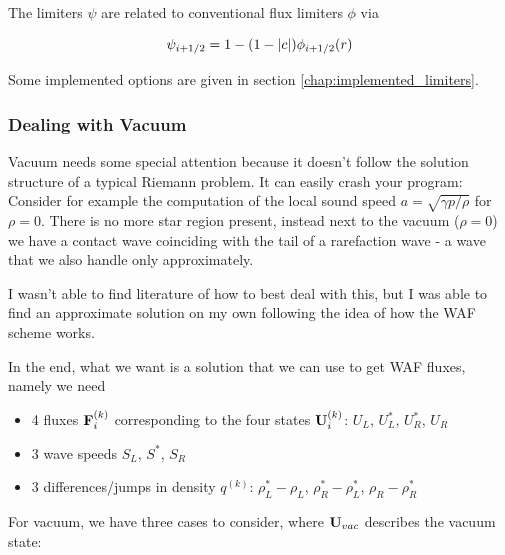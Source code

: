 The limiters $\psi$ are related to conventional flux limiters $\phi$ via

\begin{equation}
	\psi_{i+1/2} = 1 - ( 1 - |c|) \phi_{i+1/2}(r)
\end{equation}

Some implemented options are given in section \ref{chap:implemented_limiters}.












\subsubsection{Dealing with Vacuum}\label{chap:hydro-WAF-vacuum}


Vacuum needs some special attention because it doesn't follow the solution structure of a typical Riemann problem.
It can easily crash your program:
Consider for example the computation of the local sound speed $a = \sqrt{\gamma p/\rho}$ for $\rho = 0$.
There is no more star region present, instead next to the vacuum ($\rho = 0$) we have a contact wave coinciding with the tail of a rarefaction wave - a wave that we also handle only approximately.

I wasn't able to find literature of how to best deal with this, but I was able to find an approximate solution on my own following the idea of how the WAF scheme works.

In the end, what we want is a solution that we can use to get WAF fluxes, namely we need

\begin{itemize}
	\item 4 fluxes $\mathbf{F}_{i}^{(k)}$ corresponding to the four states $\mathbf{U}_{i}^{(k)}$: $U_L$, $U_L^*$, $U_R^*$, $U_R$
	\item 3 wave speeds $S_L$, $S^*$, $S_R$
	\item 3 differences/jumps in density $q^{(k)}$: $\rho_L^* - \rho_L$, $\rho_R^* - \rho_L^*$, $\rho_R - \rho_R^*$
\end{itemize}

For vacuum, we have three cases to consider, where $\mathbf{U}_{vac}$ describes the vacuum state:


